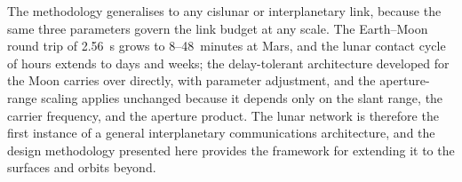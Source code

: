 \documentclass[11pt,a4paper]{article}
\begin{document}
The methodology generalises to any cislunar or interplanetary link, because the same three parameters govern the link budget at any scale. The Earth--Moon round trip of \SI{2.56}{\second} grows to \SI{8}{}--\SI{48}{minutes} at Mars, and the lunar contact cycle of hours extends to days and weeks; the delay-tolerant architecture developed for the Moon carries over directly, with parameter adjustment, and the aperture-range scaling applies unchanged because it depends only on the slant range, the carrier frequency, and the aperture product. The lunar network is therefore the first instance of a general interplanetary communications architecture, and the design methodology presented here provides the framework for extending it to the surfaces and orbits beyond.




\end{document}
